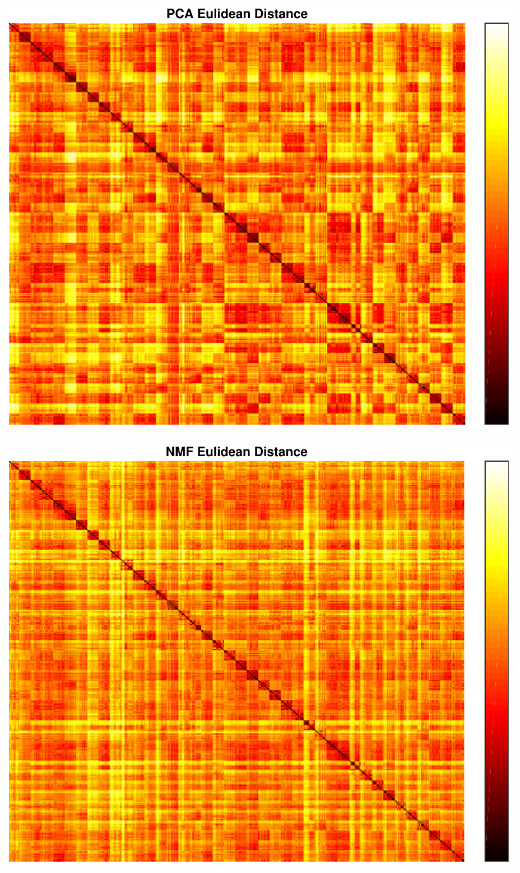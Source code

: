 \begin{center}
\begin{minipage}[t]{\linewidth}
\center
{
\includegraphics[width=\MyFactor\textwidth]{Img/pcaeu} 
}
\end{minipage}
\medskip
\end{center}

\begin{center}
\begin{minipage}[t]{\linewidth}
\center
{
\includegraphics[width=\MyFactor\textwidth]{Img/nmfeu} 
}
\end{minipage}
\medskip
\end{center}

